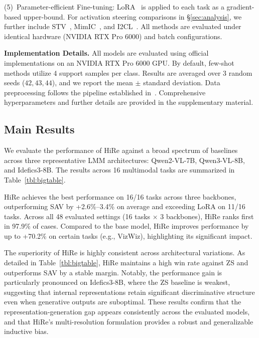 \documentclass[sigconf,review,anonymous,9pt,table]{acmart}
\newcommand{\minisection}[1]{\smallskip\noindent\textbf{#1}}
\begin{document}
(5)~Parameter-efficient Fine-tuning: LoRA~\cite{hu2022lora} is applied to each task as a gradient-based upper-bound.
For activation steering comparisons in \S\ref{sec:analysis}, we further include STV~\cite{ma2026and}, MimIC~\cite{jiang2025mimic}, and I2CL~\cite{li2025implicit}. 
All methods are evaluated under identical hardware (NVIDIA RTX Pro 6000) and batch configurations.

\minisection{Implementation Details.}
All models are evaluated using official implementations on an NVIDIA RTX Pro 6000 GPU. 
By default, few-shot methods utilize 4 support samples per class. 
Results are averaged over 3 random seeds ($42, 43, 44$), and we report the mean $\pm$ standard deviation. 
Data preprocessing follows the pipeline established in~\cite{mitra2025enhancing}. 
Comprehensive hyperparameters and further details are provided in the supplementary material.

\subsection{Main Results}
\label{sec:main}

We evaluate the performance of HiRe against a broad spectrum of baselines across three representative LMM architectures: Qwen2-VL-7B, Qwen3-VL-8B, and Idefics3-8B. 
The results across 16 multimodal tasks are summarized in Table~\ref{tbl:bigtable}.

HiRe achieves the best performance on 16/16 tasks across three backbones, outperforming SAV by +2.6\%--3.4\% on average and exceeding LoRA on 11/16 tasks.
Across all 48 evaluated settings (16 tasks $\times$ 3 backbones), HiRe ranks first in 97.9\% of cases.
Compared to the base model, HiRe improves performance by up to +70.2\% on certain tasks (e.g., VizWiz), highlighting its significant impact.

The superiority of HiRe is highly consistent across architectural variations. 
As detailed in Table~\ref{tbl:bigtable}, HiRe maintains a high win rate against ZS and outperforms SAV by a stable margin. 
Notably, the performance gain is particularly pronounced on Idefics3-8B, where the ZS baseline is weakest, suggesting that internal representations retain significant discriminative structure even when generative outputs are suboptimal. 
These results confirm that the representation-generation gap appears consistently across the evaluated models, and that HiRe's multi-resolution formulation provides a robust and generalizable inductive bias.
\end{document}
